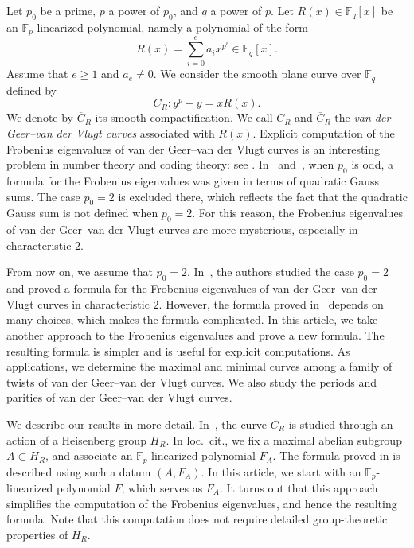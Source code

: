 \documentclass[12pt,a4paper]{amsart}
\theoremstyle{definition}
\def\F{{\mathbb F}}
\theoremstyle{remark}
\begin{document}
Let $p_0$ be a prime, $p$ a power of $p_0$, and $q$ a power of $p$. 
Let $R(x)\in\F_q[x]$ be an $\F_p$-linearized polynomial, namely a polynomial of the form 
\[
R(x)=\sum_{i=0}^e a_i x^{p^i} \in \F_q[x].\]
Assume that $e\geq1$ and $a_e \neq 0$. We consider the smooth plane curve over $\F_q$ defined by 
\[
C_R: y^p-y=xR(x). 
\] 
We denote by $\overline{C}_R$ its smooth compactification. We call $C_R$ and $\overline{C}_R$ the \textit{van der Geer--van der Vlugt curves} associated with $R(x)$. 
Explicit computation of the Frobenius eigenvalues of van der Geer--van der Vlugt curves is an interesting problem in number theory and coding theory: see \cite{BP, C, GV, ITT, ITT0, TT}.
In~\cite{ITT} and~\cite{TT}, when $p_0$ is odd, a formula for the Frobenius eigenvalues was given in terms of quadratic Gauss sums. The case $p_0=2$ is excluded there, which reflects the fact that the quadratic Gauss sum is not defined when $p_0=2$. For this reason, the Frobenius eigenvalues of van der Geer--van der Vlugt curves are more mysterious, especially in characteristic $2$. 

From now on, we assume that $p_0=2$. In~\cite{ITT0}, the authors studied the case $p_0=2$ and proved a formula for the Frobenius eigenvalues of van der Geer--van der Vlugt curves in characteristic $2$.
However, the formula proved in~\cite{ITT0} depends on many choices, which makes the formula complicated. 
In this article, we take another approach to the Frobenius eigenvalues and prove a new formula. The resulting formula is simpler and is useful for explicit computations. 
As applications, we determine the maximal and minimal curves among a family of twists of van der Geer--van der Vlugt curves.
We also study the periods and parities of van der Geer--van der Vlugt curves. 

\medskip


We describe our results in more detail. In~\cite{ITT0}, the curve $C_R$ is studied through an action of a Heisenberg group $H_R$. In loc.~cit., we fix a maximal abelian subgroup $A\subset H_R$, and associate an $\F_p$-linearized polynomial $F_A$. The formula proved in \cite{ITT0} is described using such a datum $(A,F_A)$. In this article, we start with an $\F_p$-linearized polynomial $F$, which serves as $F_A$. It turns out that this approach simplifies the computation of the Frobenius eigenvalues, and hence the resulting formula. Note that this computation does not require detailed group-theoretic properties of $H_R$. 
\end{document}

